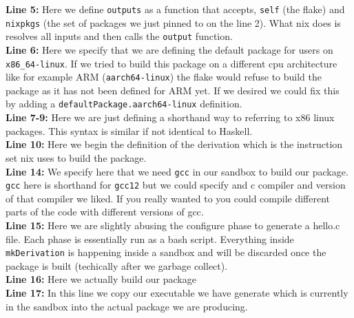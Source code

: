 \textbf{Line 5:} Here we define \texttt{outputs} as a function that accepts, \texttt{self} (the flake) and \texttt{nixpkgs} (the set of packages we just pinned to on the line 2). What nix does is resolves all inputs and then calls the \texttt{output} function.\\

\textbf{Line 6:} Here we specify that we are defining the default package for users on \texttt{x86\_64-linux}. If we tried to build this package on a different cpu architecture like for example ARM (\texttt{aarch64-linux}) the flake would refuse to build the package  as it has not been defined for ARM yet. If we desired we could fix this by adding a \texttt{defaultPackage.aarch64-linux} definition.\\

\textbf{Line 7-9:} Here we are just defining a shorthand way to referring to x86 linux packages. This syntax is similar if not identical to Haskell.\\

\textbf{Line 10:} Here we begin the definition of the derivation which is the instruction set nix uses to build the package.\\

\textbf{Line 14:} We specify here that we need \texttt{gcc} in our sandbox to build our package. \texttt{gcc} here is shorthand for \texttt{gcc12} but we could specify and c compiler and version of that compiler we liked. If you really wanted to you could compile different parts of the code with different versions of gcc.\\

\textbf{Line 15:} Here we are slightly abusing the configure phase to generate a hello.c file. Each phase is essentially run as a bash script. Everything inside \texttt{mkDerivation} is happening inside a sandbox and will be discarded once the package is built (techically after we garbage collect). \\

\textbf{Line 16:} Here we actually build our package \\

\textbf{Line 17:} In this line we copy our executable we have generate which is currently in the sandbox into the actual package we are producing. \\
